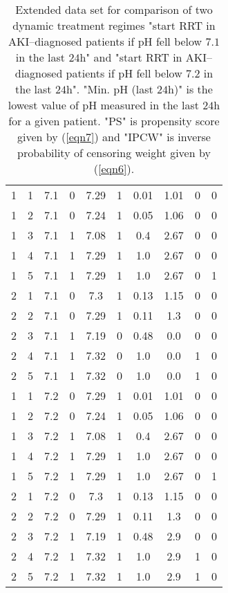 \documentclass[12pt]{article}
\begin{document}
\begin{landscape}
\begin{table}[h!]
\begin{center}
\begin{tabular}{c|c|c|c|c|c|c|c|c|c}
      \hline
1 & 1 & 7.1 & 0 & 7.29 & 1 & 0.01 & 1.01 & 0 & 0 \\
1 & 2 & 7.1 & 0 & 7.24 & 1 & 0.05 & 1.06 & 0 & 0 \\
1 & 3 & 7.1 & 1 & 7.08 & 1 & 0.4 & 2.67 & 0 & 0 \\
1 & 4 & 7.1 & 1 & 7.29 & 1 & 1.0 & 2.67 & 0 & 0 \\
1 & 5 & 7.1 & 1 & 7.29 & 1 & 1.0 & 2.67 & 0 & 1 \\
      \hline
2 & 1 & 7.1 & 0 & 7.3 & 1 & 0.13 & 1.15 & 0 & 0 \\
2 & 2 & 7.1 & 0 & 7.29 & 1 & 0.11 & 1.3 & 0 & 0 \\
2 & 3 & 7.1 & 1 & 7.19 & 0 & 0.48 & 0.0 & 0 & 0 \\
2 & 4 & 7.1 & 1 & 7.32 & 0 & 1.0 & 0.0 & 1 & 0 \\
2 & 5 & 7.1 & 1 & 7.32 & 0 & 1.0 & 0.0 & 1 & 0 \\
      \hline
      \hline
1 & 1 & 7.2 & 0 & 7.29 & 1 & 0.01 & 1.01 & 0 & 0 \\
1 & 2 & 7.2 & 0 & 7.24 & 1 & 0.05 & 1.06 & 0 & 0 \\
1 & 3 & 7.2 & 1 & 7.08 & 1 & 0.4 & 2.67 & 0 & 0 \\
1 & 4 & 7.2 & 1 & 7.29 & 1 & 1.0 & 2.67 & 0 & 0 \\
1 & 5 & 7.2 & 1 & 7.29 & 1 & 1.0 & 2.67 & 0 & 1 \\
      \hline
2 & 1 & 7.2 & 0 & 7.3 & 1 & 0.13 & 1.15 & 0 & 0 \\
2 & 2 & 7.2 & 0 & 7.29 & 1 & 0.11 & 1.3 & 0 & 0 \\
2 & 3 & 7.2 & 1 & 7.19 & 1 & 0.48 & 2.9 & 0 & 0 \\
2 & 4 & 7.2 & 1 & 7.32 & 1 & 1.0 & 2.9 & 1 & 0 \\
2 & 5 & 7.2 & 1 & 7.32 & 1 & 1.0 & 2.9 & 1 & 0 \\
      \hline
      \hline
\end{tabular}
\caption{Extended data set for comparison of two dynamic treatment regimes "start RRT in AKI--diagnosed patients if pH fell below $7.1$ in the last $24$h" and "start RRT in AKI--diagnosed patients if pH fell below $7.2$ in the last $24$h".  "Min. pH (last $24$h)" is the lowest value of pH measured in the last $24$h for a given patient.  "PS" is propensity score given by (\ref{eqn7}) and "IPCW" is inverse probability of censoring weight given by (\ref{eqn6}). } \label{table1}
\end{center}
\end{table}
\end{landscape}
\end{document}
